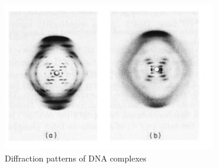 \begin{figure}[H]
    \centering
    \includegraphics[width=0.9\columnwidth]{figures/DNA diffraction.png}
    \caption{Diffraction patterns of DNA complexes}
    \label{fig:diffraction}
\end{figure}
